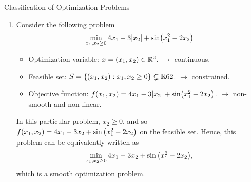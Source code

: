 \begin{eg}{Classification of Optimization Problems}
\begin{enumerate}
		\item Consider the following problem \[\min_{x_1,x_2\geq0}4x_1-3\qty|x_2|+\sin(x_1^2-2x_2)\]
		\begin{sol}
			\begin{itemize}
				\item Optimization variable: $x=(x_1,x_2)\in{\mathbb{R}}^2$. $\longrightarrow$ continuous. 
				\item Feasible set: $S=\qty{(x_1,x_2):x_1,x_2\geq0}\subsetneq{\mathbb{R}}62$. $\longrightarrow$ constrained.
				\item Objective function: $f(x_1,x_2)=4x_1-3\qty|x_2|+\sin(x_1^2-2x_2)$. $\longrightarrow$ non-smooth and non-linear.
			\end{itemize}	
		\end{sol}
		\begin{rmk}
			In this particular problem, $x_2\geq0$, and so $f(x_1,x_2)=4x_1-3x_2+\sin\qty(x_1^2-2x_2)$ on the feasible set. Hence, this problem can be equivalently written as \[\min_{x_1,x_2\geq0}4x_1-3x_2+\sin\qty(x_1^2-2x_2),\] which is a smooth optimization problem. 
		\end{rmk}
	\end{enumerate}
\end{eg}

